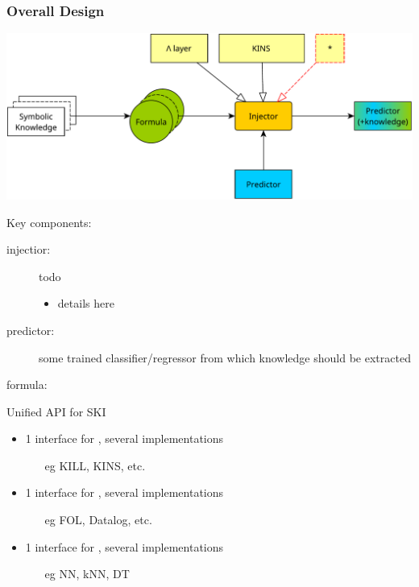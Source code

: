 \documentclass[presentation]{beamer}\mode<presentation>{\usetheme{AMSBolognaFC}}
\begin{document}
\begin{frame}[allowframebreaks]
\frametitle{Overall Design}

    \begin{center}
        \includegraphics[width=\linewidth]{figures/psyki-design.pdf}
    \end{center}

    \framebreak

    Key components:
    \begin{description}
        \item[injectior:] todo
        \begin{itemize}
            \item details here
        \end{itemize}

        \item[predictor:] some trained classifier/regressor from which knowledge should be extracted
                
        \item[formula:] 
    \end{description}

    \begin{block}{Unified API for SKI}
        \begin{itemize}
            \item 1 interface for , several implementations
            \begin{itemize}
                \item[eg] KILL, KINS, etc.
            \end{itemize}
            \item 1 interface for , several implementations
            \begin{itemize}
                \item[eg] FOL, Datalog, etc.
            \end{itemize}
            \item 1 interface for , several implementations
            \begin{itemize}
                \item[eg] NN, kNN, DT
            \end{itemize}
        \end{itemize}
    \end{block}
\end{frame}
\end{document}

